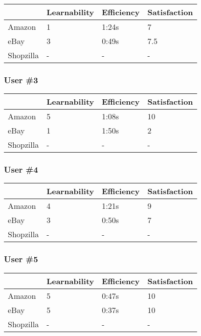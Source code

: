 \documentclass[11pt, oneside]{article}   	%
\begin{document}
\begin{tabular}{| l | l | l | l |}
    \hline
     & Learnability & Efficiency & Satisfaction \\ \hline
    Amazon & 1 & 1:24s & 7 \\ \hline
    eBay & 3 & 0:49s & 7.5 \\ \hline
    Shopzilla & - & - & - \\\hline
\end{tabular}

\subsubsection{User \#3}

\begin{tabular}{| l | l | l | l |}
    \hline
     & Learnability & Efficiency & Satisfaction \\ \hline
    Amazon & 5 & 1:08s & 10 \\ \hline
    eBay & 1 & 1:50s & 2 \\ \hline
    Shopzilla & - & - & - \\\hline
\end{tabular}

\subsubsection{User \#4}

\begin{tabular}{| l | l | l | l |}
    \hline
     & Learnability & Efficiency & Satisfaction \\ \hline
    Amazon & 4 & 1:21s & 9 \\ \hline
    eBay & 3 & 0:50s & 7 \\ \hline
    Shopzilla & - & - & - \\\hline
\end{tabular}

\subsubsection{User \#5}

\begin{tabular}{| l | l | l | l |}
    \hline
     & Learnability & Efficiency & Satisfaction \\ \hline
    Amazon & 5 & 0:47s & 10 \\ \hline
    eBay & 5 & 0:37s & 10 \\ \hline
    Shopzilla & - & - & - \\\hline
\end{tabular}
\end{document}
